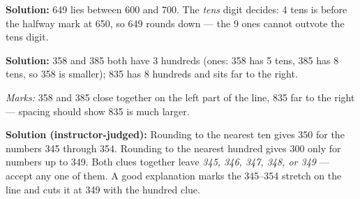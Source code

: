 \documentclass[12pt]{article}
\begin{document}

\textbf{Solution:} 649 lies between 600 and 700. The \emph{tens} digit
decides: 4 tens is before the halfway mark at 650, so 649 rounds down ---
the 9 ones cannot outvote the tens digit. 


\textbf{Solution:} 358 and 385 both have 3 hundreds (ones: 358 has 5 tens,
385 has 8 tens, so 358 is smaller); 835 has 8 hundreds and sits far to the
right. 

\emph{Marks:} 358 and 385 close together on the left part of the line, 835
far to the right --- spacing should show 835 is much larger.


\textbf{Solution (instructor-judged):} Rounding to the nearest ten gives 350
for the numbers 345 through 354. Rounding to the nearest hundred gives 300
only for numbers up to 349. Both clues together leave \emph{345, 346, 347,
348, or 349} --- accept any one of them. A good explanation marks the
345--354 stretch on the line and cuts it at 349 with the hundred clue.
\end{document}
